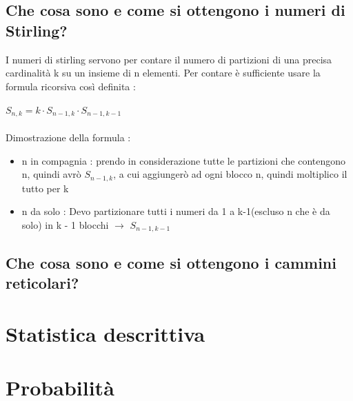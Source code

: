 \documentclass[a4paper,12pt]{report}
\begin{document}
	\subsection{Che cosa sono e come si ottengono i numeri di Stirling?}
	I numeri di stirling servono per contare il numero di partizioni di una precisa cardinalità k su un insieme di n elementi. Per contare è sufficiente usare la formula ricorsiva così definita : \\\\
	$S_{n, k} = k \cdot S_{n - 1, k} \cdot S_{n - 1, k - 1}$ \\\\
	Dimostrazione della formula : 
	\begin{itemize}
		\item n in compagnia : prendo in considerazione tutte le partizioni che contengono n, quindi avrò $S_{n - 1, k}$, a cui aggiungerò ad ogni blocco n, quindi moltiplico il tutto per k
		\item n da solo : Devo partizionare tutti i numeri da 1 a k-1(escluso n che è da solo) in k - 1 blocchi $\rightarrow$ $S_{n - 1, k - 1}$
	\end{itemize}
	\subsection{Che cosa sono e come si ottengono i cammini reticolari?}
	\section{Statistica descrittiva}
	\newpage
	\section{Probabilità}
\end{document}
